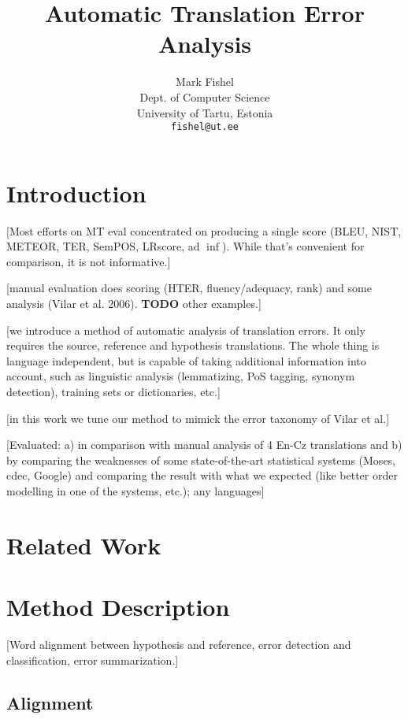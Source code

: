 \documentclass[11pt]{article}
\title{Automatic Translation Error Analysis}
\author{Mark Fishel \\
  Dept. of Computer Science \\
  University of Tartu, Estonia \\
  {\tt fishel@ut.ee} \\
  }
\date{}
\newcommand{\tmp}[1]{[#1]}
\newcommand{\todo}[0]{\textbf{TODO}}
\begin{document}
\maketitle
\begin{abstract}
\end{abstract}

\section{Introduction}

\tmp{Most efforts on MT eval concentrated on producing a single score (BLEU, NIST, METEOR, TER, SemPOS, LRscore, ad
$\inf$). While that's convenient for comparison, it is not informative.}

\tmp{manual evaluation does scoring (HTER, fluency/adequacy, rank) and some analysis (Vilar et al. 2006). \todo{}
other examples.}

\tmp{we introduce a method of automatic analysis of translation errors. It only requires the source, reference and
hypothesis translations. The whole thing is language independent, but is capable of taking additional information into
account, such as linguistic analysis (lemmatizing, PoS tagging, synonym detection), training sets or dictionaries,
etc.}

\tmp{in this work we tune our method to mimick the error taxonomy of Vilar et al.}

\tmp{Evaluated: a) in comparison with manual analysis of 4 En-Cz translations and b) by comparing the weaknesses of some
state-of-the-art statistical systems (Moses, cdec, Google) and comparing the result with what we expected (like better
order modelling in one of the systems, etc.); any languages}

\section{Related Work}

\section{Method Description}

\tmp{Word alignment between hypothesis and reference, error detection and classification, error summarization.}

\subsection{Alignment}
\end{document}
